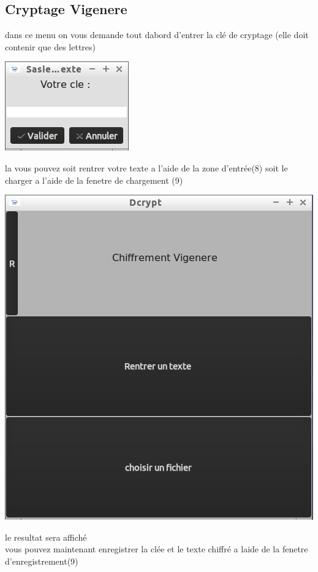 \documentclass[a4]{article}
\begin{document}
		\subsection{Cryptage Vigenere}
		dans ce menu on vous demande tout dabord d'entrer la clé de cryptage (elle 
		doit contenir que des lettres)
			\begin{center}\includegraphics[scale=0.4]{22.png}\end{center}
			la vous pouvez soit rentrer votre texte a l'aide de la zone d'entrée(8)
			soit le charger a l'aide de la fenetre de chargement (9)
			\begin{center}\includegraphics[scale=0.4]{6.png}\end{center}
			le resultat sera affiché \\
			vous pouvez maintenant enregistrer la clée et le texte chiffré a laide 
			de la fenetre d'enregistrement(9)
\end{document}
